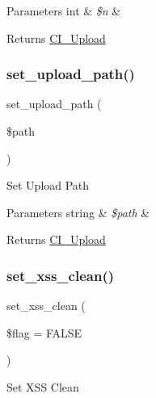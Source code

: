 \begin{DoxyParams}[1]{Parameters}
int & {\em \$n} & \\
\hline
\end{DoxyParams}
\begin{DoxyReturn}{Returns}
\mbox{\hyperlink{class_c_i___upload}{C\+I\+\_\+\+Upload}} 
\end{DoxyReturn}
\mbox{\label{class_c_i___upload_ab2407f3a942d9b203f54e21194cf040d}} 
\subsubsection{\texorpdfstring{set\+\_\+upload\+\_\+path()}{set\_upload\_path()}}
{\footnotesize\ttfamily set\+\_\+upload\+\_\+path (\begin{DoxyParamCaption}\item[{}]{\$path }\end{DoxyParamCaption})}

Set Upload Path


\begin{DoxyParams}[1]{Parameters}
string & {\em \$path} & \\
\hline
\end{DoxyParams}
\begin{DoxyReturn}{Returns}
\mbox{\hyperlink{class_c_i___upload}{C\+I\+\_\+\+Upload}} 
\end{DoxyReturn}
\mbox{\label{class_c_i___upload_a5556024223414507d84d221862919212}} 
\subsubsection{\texorpdfstring{set\+\_\+xss\+\_\+clean()}{set\_xss\_clean()}}
{\footnotesize\ttfamily set\+\_\+xss\+\_\+clean (\begin{DoxyParamCaption}\item[{}]{\$flag = {\ttfamily FALSE} }\end{DoxyParamCaption})}

Set X\+SS Clean

